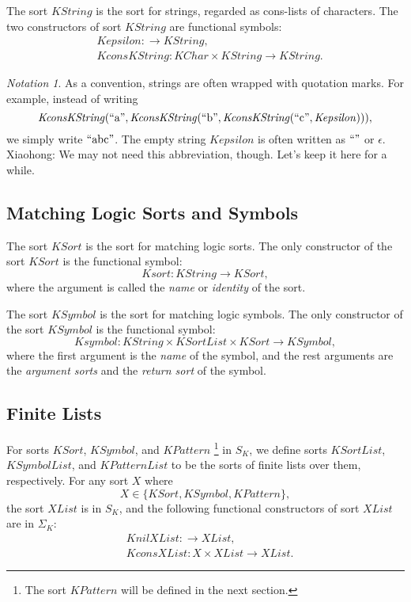 \documentclass[UTF8,11pt]{article}
\newcounter{thmcounter}
\theoremstyle{plain}
\theoremstyle{definition}
\theoremstyle{remark}
\newtheorem{notation}[thmcounter]{Notation}
\newcommand{\KChar}{\mathit{KChar}}
\newcommand{\KString}{\mathit{KString}}
\newcommand{\Kepsilon}{\mathit{Kepsilon}}
\newcommand{\KconsKString}{\mathit{KconsKString}}
\newcommand{\KSort}{\mathit{KSort}}
\newcommand{\KSymbol}{\mathit{KSymbol}}
\newcommand{\XList}{\mathit{XList}}
\newcommand{\KnilXList}{\mathit{KnilXList}}
\newcommand{\KconsXList}{\mathit{KconsXList}}
\newcommand{\KSortList}{\mathit{KSortList}}
\newcommand{\Ksort}{\mathit{Ksort}}
\newcommand{\KSymbolList}{\mathit{KSymbolList}}
\newcommand{\Ksymbol}{\mathit{Ksymbol}}
\newcommand{\KPattern}{\mathit{KPattern}}
\newcommand{\KPatternList}{\mathit{KPatternList}}
\newcommand{\quot}[1]{\mathrm{``#1"}}
\begin{document}
The sort $\KString$ is the sort for strings, regarded as cons-lists of characters.
The two constructors of sort $\KString$ are functional symbols:
\begin{align*}
  & \Kepsilon \colon \to \KString,
  \\
  & \mathit{KconsKString} \colon \KChar \times \KString \to \KString.
\end{align*}

\begin{notation}
	As a convention, strings are often wrapped with quotation marks. 
	For example, instead of writing
	$$
	\KconsKString(\quot{a}, \KconsKString(\quot{b}, \KconsKString(\quot{c}, \Kepsilon))),
	$$
	we simply write $\quot{abc}$.
	The empty string $\Kepsilon$ is often written as $\quot{}$ or $\epsilon$.
	\unsure
	{Xiaohong: We may not need this abbreviation, though. Let's keep it here for a while. }
\end{notation}




\subsection{Matching Logic Sorts and Symbols}

The sort $\KSort$ is the sort for matching logic sorts.
The only constructor of the sort $\KSort$ is the functional symbol:
\begin{equation*}
\Ksort \colon \KString \to \KSort,
\end{equation*}
where the argument is called the \emph{name} or \emph{identity} of the sort. 

The sort $\KSymbol$ is the sort for matching logic symbols.
The only constructor of the sort $\KSymbol$ is the functional symbol:
\begin{equation*}
\Ksymbol \colon \KString \times \KSortList \times \KSort \to \KSymbol,
\end{equation*}
where the first argument is the \emph{name} of the symbol, and the rest arguments are the \emph{argument sorts} and the \emph{return sort} of the symbol. 

\subsection{Finite Lists}

For sorts $\KSort$, $\KSymbol$, and $\KPattern$
\footnote{The sort $\KPattern$ will be defined in the next section.}
in $S_K$,
we define sorts $\KSortList$, $\KSymbolList$, and $\KPatternList$ to be the sorts of finite lists over them, respectively.
For any sort $X$ where
$$
X \in \{\KSort, \KSymbol, \KPattern\},
$$
the sort $\XList$ is in $S_K$, and the following functional constructors of sort $\XList$ are in $\Sigma_K$:
\begin{align*}
  & \KnilXList \colon \to \XList,
  \\
  & \KconsXList \colon \mathit{X} \times \XList \to \XList.
\end{align*}
\end{document}
